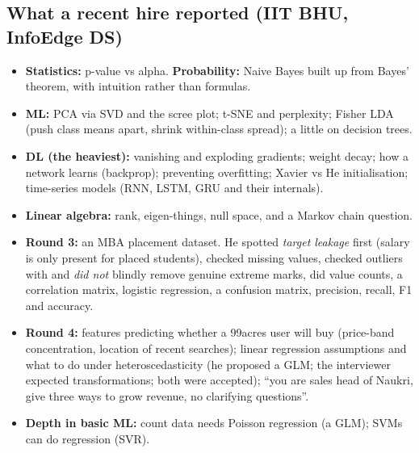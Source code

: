 \subsection*{What a recent hire reported (IIT BHU, InfoEdge DS)}
\begin{itemize}
\item \textbf{Statistics:} p-value vs alpha. \textbf{Probability:} Naive Bayes built up from Bayes'
  theorem, with intuition rather than formulas.
\item \textbf{ML:} PCA via SVD and the scree plot; t-SNE and perplexity; Fisher LDA (push class means
  apart, shrink within-class spread); a little on decision trees.
\item \textbf{DL (the heaviest):} vanishing and exploding gradients; weight decay; how a network learns
  (backprop); preventing overfitting; Xavier vs He initialisation; time-series models (RNN, LSTM, GRU and
  their internals).
\item \textbf{Linear algebra:} rank, eigen-things, null space, and a Markov chain question.
\item \textbf{Round 3:} an MBA placement dataset. He spotted \emph{target leakage} first (salary is only
  present for placed students), checked missing values, checked outliers with  and
  \emph{did not} blindly remove genuine extreme marks, did value counts, a correlation matrix, logistic
  regression, a confusion matrix, precision, recall, F1 and accuracy.
\item \textbf{Round 4:} features predicting whether a 99acres user will buy (price-band concentration,
  location of recent searches); linear regression assumptions and what to do under heteroscedasticity
  (he proposed a GLM; the interviewer expected transformations; both were accepted); ``you are sales head
  of Naukri, give three ways to grow revenue, no clarifying questions''.
\item \textbf{Depth in basic ML:} count data needs Poisson regression (a GLM); SVMs can do regression (SVR).
\end{itemize}

